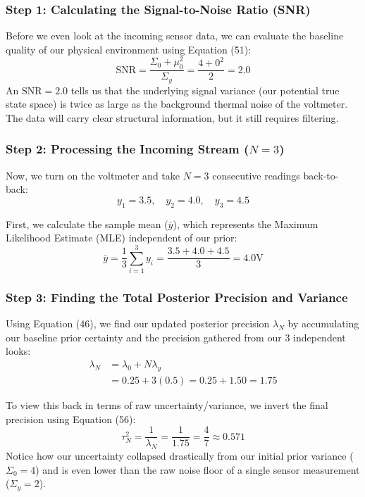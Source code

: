 \documentclass{article}
\begin{document}
\subsubsection*{Step 1: Calculating the Signal-to-Noise Ratio (SNR)}
Before we even look at the incoming sensor data, we can evaluate the baseline quality of our physical environment using Equation (51):
\begin{equation}
\text{SNR} = \frac{\Sigma_0 + \mu_0^2}{\Sigma_y} = \frac{4 + 0^2}{2} = 2.0 \tag{52}
\end{equation}
An $\text{SNR} = 2.0$ tells us that the underlying signal variance (our potential true state space) is twice as large as the background thermal noise of the voltmeter. The data will carry clear structural information, but it still requires filtering.

\subsubsection*{Step 2: Processing the Incoming Stream ($N = 3$)}
Now, we turn on the voltmeter and take $N = 3$ consecutive readings back-to-back:
\begin{equation*}
y_1 = 3.5, \quad y_2 = 4.0, \quad y_3 = 4.5
\end{equation*}

First, we calculate the sample mean ($\bar{y}$), which represents the Maximum Likelihood Estimate (MLE) independent of our prior:
\begin{equation}
\bar{y} = \frac{1}{3}\sum_{i=1}^3 y_i = \frac{3.5 + 4.0 + 4.5}{3} = 4.0\text{V} \tag{53}
\end{equation}

\subsubsection*{Step 3: Finding the Total Posterior Precision and Variance}
Using Equation (46), we find our updated posterior precision $\lambda_N$ by accumulating our baseline prior certainty and the precision gathered from our 3 independent looks:
\begin{align}
\lambda_N &= \lambda_0 + N\lambda_y \nonumber \\
&= 0.25 + 3(0.5) = 0.25 + 1.50 = 1.75 \tag{54}
\end{align}

To view this back in terms of raw uncertainty/variance, we invert the final precision using Equation (56):
\begin{equation}
\tau_N^2 = \frac{1}{\lambda_N} = \frac{1}{1.75} = \frac{4}{7} \approx 0.571 \tag{55}
\end{equation}
Notice how our uncertainty collapsed drastically from our initial prior variance ($\Sigma_0 = 4$) and is even lower than the raw noise floor of a single sensor measurement ($\Sigma_y = 2$). 
\end{document}
